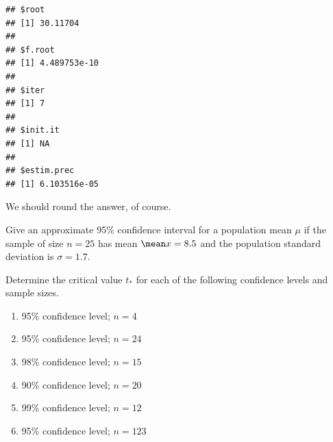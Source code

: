 \documentclass[twoside]{book}\usepackage[]{graphicx}\usepackage[]{xcolor}
\makeatletter
\newcommand{\hlnum}[1]{\textcolor[rgb]{0.686,0.059,0.569}{#1}}%
\newcommand{\hlcom}[1]{\textcolor[rgb]{0.678,0.584,0.686}{\textit{#1}}}%
\newcommand{\hlopt}[1]{\textcolor[rgb]{0,0,0}{#1}}%
\newcommand{\hlstd}[1]{\textcolor[rgb]{0.345,0.345,0.345}{#1}}%
\newcommand{\hlkwb}[1]{\textcolor[rgb]{0.69,0.353,0.396}{#1}}%
\newcommand{\hlkwd}[1]{\textcolor[rgb]{0.737,0.353,0.396}{\textbf{#1}}}%
\newenvironment{kframe}{%
 \def\at@end@of@kframe{}%
 \ifinner\ifhmode%
  \def\at@end@of@kframe{\end{minipage}}%
  \begin{minipage}{\columnwidth}%
 \fi\fi%
 \def\FrameCommand##1{\hskip\@totalleftmargin \hskip-\fboxsep
 \colorbox{shadecolor}{##1}\hskip-\fboxsep
     \hskip-\linewidth \hskip-\@totalleftmargin \hskip\columnwidth}%
 \MakeFramed {\advance\hsize-\width
   \@totalleftmargin\z@ \linewidth\hsize
   \@setminipage}}%
 {\par\unskip\endMakeFramed%
 \at@end@of@kframe}
\newenvironment{knitrout}{}{} %
\makeatother
\begin{document}
\begin{solution}
\begin{enumerate}
\begin{knitrout}
\begin{kframe}
\begin{alltt}
\end{alltt}
\begin{verbatim}
## $root
## [1] 30.11704
## 
## $f.root
## [1] 4.489753e-10
## 
## $iter
## [1] 7
## 
## $init.it
## [1] NA
## 
## $estim.prec
## [1] 6.103516e-05
\end{verbatim}
\end{kframe}
\end{knitrout}
We should round the answer, of course.
	\end{enumerate}
\end{solution}

\begin{problem}
Give an approximate 95\% confidence interval for a population mean $\mu$ 
if the sample of size $n=25$ has mean $\mean x=8.5$ and the population standard deviation is 
$\sigma=1.7$.
\end{problem}



\begin{problem}
	Determine the critical value $t_*$ for each of the following confidence levels and 
	sample sizes.
	\begin{enumerate}
		\item
			95\% confidence level; $n=4$
		\item
			95\% confidence level; $n=24$
		\item
			98\% confidence level; $n=15$
		\item
			90\% confidence level; $n=20$
		\item
			99\% confidence level; $n=12$
		\item
			95\% confidence level; $n=123$
	\end{enumerate}
\end{problem}
\end{document}
